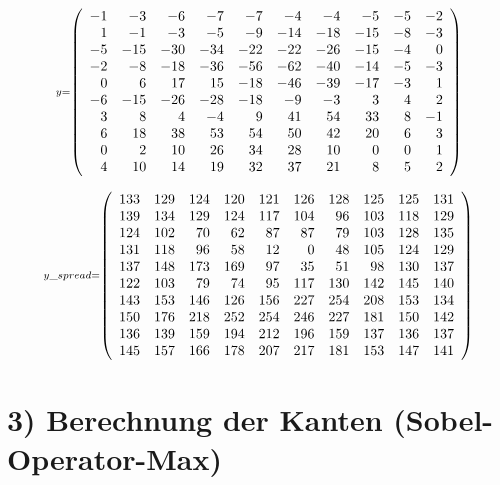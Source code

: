 \documentclass[11pt]{article}
\begin{document}
    
    \[\scriptstyle y =  \def\g{\color{lightgray}}\left(\begin{array}{rrrrrrrrrr}-1 & -3 & -6 & -7 & -7 & -4 & -4 & -5 & -5 & -2\\1 & -1 & -3 & -5 & -9 & -14 & -18 & -15 & -8 & -3\\-5 & -15 & -30 & -34 & -22 & -22 & -26 & -15 & -4 & 0\\-2 & -8 & -18 & -36 & -56 & -62 & -40 & -14 & -5 & -3\\0 & 6 & 17 & 15 & -18 & -46 & -39 & -17 & -3 & 1\\-6 & -15 & -26 & -28 & -18 & -9 & -3 & 3 & 4 & 2\\3 & 8 & 4 & -4 & 9 & 41 & 54 & 33 & 8 & -1\\6 & 18 & 38 & 53 & 54 & 50 & 42 & 20 & 6 & 3\\0 & 2 & 10 & 26 & 34 & 28 & 10 & 0 & 0 & 1\\4 & 10 & 14 & 19 & 32 & 37 & 21 & 8 & 5 & 2\end{array}\right)\]

    
    \[\scriptstyle y\_spread =  \def\g{\color{lightgray}}\left(\begin{array}{rrrrrrrrrr}133 & 129 & 124 & 120 & 121 & 126 & 128 & 125 & 125 & 131\\139 & 134 & 129 & 124 & 117 & 104 & 96 & 103 & 118 & 129\\124 & 102 & 70 & 62 & 87 & 87 & 79 & 103 & 128 & 135\\131 & 118 & 96 & 58 & 12 & 0 & 48 & 105 & 124 & 129\\137 & 148 & 173 & 169 & 97 & 35 & 51 & 98 & 130 & 137\\122 & 103 & 79 & 74 & 95 & 117 & 130 & 142 & 145 & 140\\143 & 153 & 146 & 126 & 156 & 227 & 254 & 208 & 153 & 134\\150 & 176 & 218 & 252 & 254 & 246 & 227 & 181 & 150 & 142\\136 & 139 & 159 & 194 & 212 & 196 & 159 & 137 & 136 & 137\\145 & 157 & 166 & 178 & 207 & 217 & 181 & 153 & 147 & 141\end{array}\right)\]

\newpage
    
    \hypertarget{berechnung-der-kanten-sobel-operator-max}{%
\section*{3) Berechnung der Kanten
(Sobel-Operator-Max)}\label{berechnung-der-kanten-sobel-operator-max}}
\end{document}
